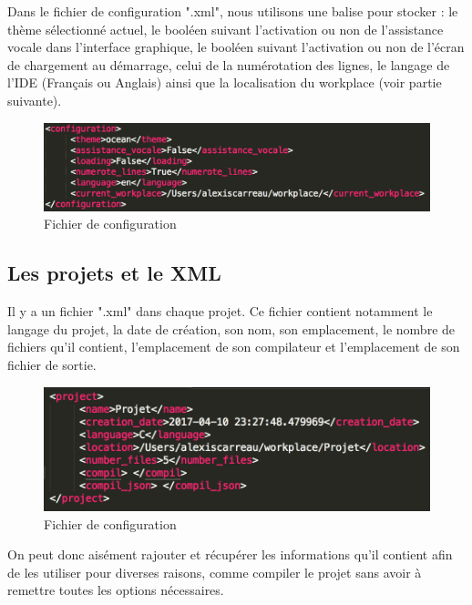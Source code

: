 \documentclass[a4paper,12pt]{article}
\begin{document}
Dans le fichier de configuration ".xml", nous utilisons une balise pour stocker : le thème sélectionné actuel, le booléen suivant l'activation ou non de l'assistance vocale dans l'interface graphique, le booléen suivant l'activation ou non de l'écran de chargement au démarrage, celui de la numérotation des lignes, le langage de l'IDE (Français ou Anglais) ainsi que la localisation du workplace (voir partie suivante).
		
\begin{figure}[h!]
			\begin{center}
				\includegraphics[scale=0.6]{images/imgs_xml/conf.png}
				\caption{Fichier de configuration}
			\end{center}
		\end{figure}
		
\subsection{Les projets et le XML}

	Il y a un fichier ".xml" dans chaque projet. Ce fichier contient notamment le langage du projet, la date de création, son nom, son emplacement, le nombre de fichiers qu'il contient, l'emplacement de son compilateur et l'emplacement de son fichier de sortie.\\
	
	\begin{figure}[h!]
			\begin{center}
				\includegraphics[scale=0.6]{images/imgs_xml/projet_xml.png}
				\caption{Fichier de configuration}
			\end{center}
		\end{figure}
		
		On peut donc aisément rajouter et récupérer les informations qu'il contient afin de les utiliser pour diverses raisons, comme compiler le projet sans avoir à remettre toutes les options nécessaires.
	
\end{document}
